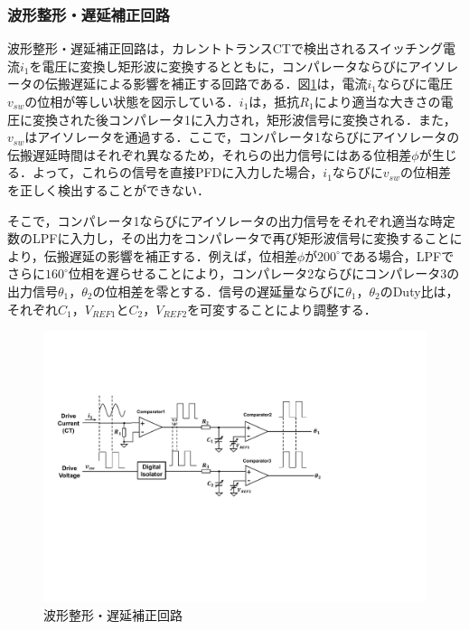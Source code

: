 \subsubsection{波形整形・遅延補正回路}
波形整形・遅延補正回路は，カレントトランスCTで検出されるスイッチング電流$i_1$を電圧に変換し矩形波に変換するとともに，コンパレータならびにアイソレータの伝搬遅延による影響を補正する回路である．図\ref{delaycompensator}は，電流$i_1$ならびに電圧$v_{sw}$の位相が等しい状態を図示している．$i_1$は，抵抗$R_1$により適当な大きさの電圧に変換された後コンパレータ1に入力され，矩形波信号に変換される．また，$v_{sw}$はアイソレータを通過する．ここで，コンパレータ1ならびにアイソレータの伝搬遅延時間はそれぞれ異なるため，それらの出力信号にはある位相差$\phi$が生じる．よって，これらの信号を直接PFDに入力した場合，$i_1$ならびに$v_{sw}$の位相差を正しく検出することができない．\par 
そこで，コンパレータ1ならびにアイソレータの出力信号をそれぞれ適当な時定数のLPFに入力し，その出力をコンパレータで再び矩形波信号に変換することにより，伝搬遅延の影響を補正する．例えば，位相差$\phi$が$200^\circ$である場合，LPFでさらに$160^\circ$位相を遅らせることにより，コンパレータ2ならびにコンパレータ3の出力信号$\theta_1$，$\theta_2$の位相差を零とする．信号の遅延量ならびに$\theta_1$，$\theta_2$のDuty比は，それぞれ$C_1$，$V_{REF1}$と$C_2$，$V_{REF2}$を可変することにより調整する．


\begin{figure}[h]
\begin{center}

\includegraphics[width=160mm]{figures/delaycompensator.pdf}
\caption{波形整形・遅延補正回路}
\label{delaycompensator}

\end{center}
\end{figure}

